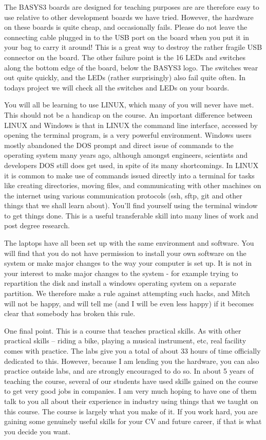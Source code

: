 \documentclass[../physical_computing.tex]{subfiles}
\begin{document}
The BASYS3 boards are designed for teaching purposes are are therefore easy to use relative to other development boards we have tried. However, the hardware on these boards is quite cheap, and occasionally fails. Please do not leave the connecting cable plugged in to the USB port on the board when you put it in your bag to carry it around! This is a great way to destroy the rather fragile USB connector on the board. The other failure point is the 16 LEDs and switches along the bottom edge of the board, below the BASYS3 logo. The switches wear out quite quickly, and the LEDs (rather surprisingly) also fail quite often. In todays project we will check all the switches and LEDs on your boards.

You will all be learning to use LINUX, which many of you will never have met. This should not be a handicap on the course. An important difference between LINUX and Windows is that in LINUX the command line interface, accessed by opening the terminal program, is a very powerful environment. Windows users mostly abandoned the DOS prompt and direct issue of commands to the operating system many years ago, although amongst engineers, scientists and developers DOS still does get used, in spite of its many shortcomings. In LINUX it is common to make use of commands issued directly into a terminal for tasks like creating directories, moving files, and communicating with other machines on the internet using various communication protocols (ssh, sftp, git and other things that we shall learn about). You’ll find yourself using the terminal window to get things done. This is a useful transferable skill into many lines of work and post degree research.

The laptops have all been set up with the same environment and software. You will find that you do not have permission to install your own software on the system or make major changes to the way your computer is set up. It is not in your interest to make major changes to the system -  for example trying to repartition the disk and install a windows operating system on a separate partition. We therefore make a rule against attempting such hacks, and Mitch will not be happy, and will tell me (and I will be even less happy) if it becomes clear that somebody has broken this rule. 

One final point. This is a course that teaches practical skills. As with other practical skills – riding a bike, playing a musical instrument, etc, real facility comes with practice. The labs give you a total of about 33 hours of time officially dedicated to this. However, because I am lending you the hardware, you can also practice outside labs, and are strongly encouraged to do so. In about 5 years of teaching the course, several of our students have used skills gained on the course to get very good jobs in companies. I am very much hoping to have one of them talk to you all about their experience in industry using things that we taught on this course. The course is largely what you make of it. If you work hard, you are gaining some genuinely useful skills for your CV and future career, if that is what you decide you want.
\end{document}
